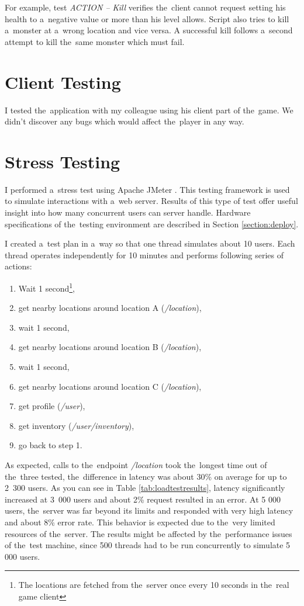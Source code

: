 For example, test \textit{ACTION -- Kill} verifies the~client cannot request setting his health to a~negative value or more than his level allows. Script also tries to kill a~monster at a~wrong location and vice versa. A successful kill follows a~second attempt to kill the~same monster which must fail. 


\section{Client Testing}
I tested the~application with my colleague using his client part of the~game. We didn't discover any bugs which would affect the~player in any way.

\section{Stress Testing}
I performed a~stress test using Apache JMeter \cite{jmeter}. This testing framework is used to simulate interactions with a~web server. Results of this type of test offer useful insight into how many concurrent users can server handle. Hardware specifications of the~testing environment are described in Section \ref{section:deploy}.

I created a~test plan in a~way so that one thread simulates about 10 users. Each thread operates independently for 10 minutes and performs following series of actions:
\begin{enumerate}
	\item Wait 1 second\footnote{The locations are fetched from the~server once every 10 seconds in the~real game client},
	\item get nearby locations around location A (\textit{/location}),
	\item wait 1 second,
	\item get nearby locations around location B (\textit{/location}),
	\item wait 1 second,
	\item get nearby locations around location C (\textit{/location}),
	\item get profile (\textit{/user}),
	\item get inventory (\textit{/user/inventory}),
	\item go back to step 1.
\end{enumerate}

 As expected, calls to the~endpoint \textit{/location} took the~longest time out of the~three tested, the~difference in latency was about 30\% on average for up to 2~300 users. As you can see in Table \ref{tab:loadtestresults}, latency significantly increased at 3~000 users and about 2\% request resulted in an error. At 5 000 users, the~server was far beyond its limits and responded with very high latency and about 8\% error rate. This behavior is expected due to the~very limited resources of the~server. The results might be affected by the~performance issues of the~test machine, since 500 threads had to be run concurrently to simulate 5 000 users.

